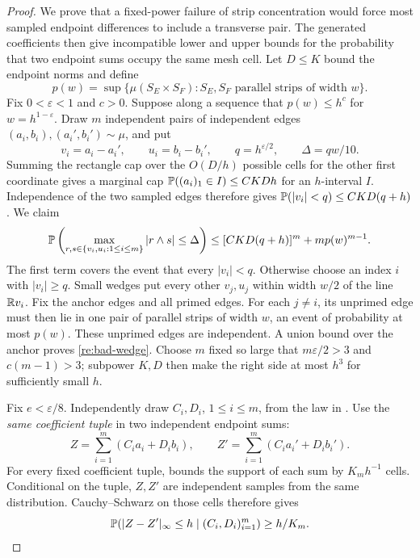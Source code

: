 \begin{proof}
We prove that a fixed-power failure of strip concentration would
force most sampled endpoint differences to include a transverse
pair.  The generated coefficients then give incompatible lower
and upper bounds for the probability that two endpoint sums
occupy the same mesh cell.
Let \(D\le K\) bound the endpoint norms and define
\[
 p(w)=\sup\{\mu(S_E\times S_F):
       S_E,S_F\text{ parallel strips of width }w\}.
\]
Fix \(0<\varepsilon<1\) and \(c>0\).  Suppose along a sequence
that \(p(w)\le h^c\) for \(w=h^{1-\varepsilon}\).
Draw \(m\) independent pairs of independent edges
\((a_i,b_i),(a_i',b_i')\sim\mu\), and put
\[
 v_i=a_i-a_i',\qquad u_i=b_i-b_i',\qquad
 q=h^{\varepsilon/2},\qquad \Delta=qw/10.
\]
Summing the rectangle cap over the \(O(D/h)\) possible cells for
the other first coordinate gives a marginal cap
\(\mathbb P((a_i)_1\in I)\le CKD h\) for an \(h\)-interval \(I\).
Independence of the two sampled edges therefore gives
\(\mathbb P(|v_i|<q)\le CKD(q+h)\).
We claim
\begin{equation}\label{re:bad-wedge}
 \mathbb P\left(\max_{r,s\in\{v_i,u_i:1\le i\le m\}}
                   |r\wedge s|\le\Delta\right)
 \le[CKD(q+h)]^m+m p(w)^{m-1}.
\end{equation}
The first term covers the event that every \(|v_i|<q\).
Otherwise choose an index \(i\) with \(|v_i|\ge q\).  Small wedges
put every other \(v_j,u_j\) within width \(w/2\) of the line
\(\mathbb R v_i\).  Fix the anchor edges and all primed edges.
For each \(j\ne i\), its unprimed edge must then lie in one pair
of parallel strips of width \(w\), an event of probability at most
\(p(w)\).  These unprimed edges are independent.  A union bound over
the anchor proves \eqref{re:bad-wedge}.  Choose \(m\) fixed so large
that \(m\varepsilon/2>3\) and \(c(m-1)>3\); subpower \(K,D\) then make
the right side at most \(h^3\) for sufficiently small \(h\).

Fix \(e<\varepsilon/8\).  Independently draw \(C_i,D_i\), \(1\le i\le m\),
from the law in .
Use the \emph{same coefficient tuple} in two independent endpoint sums:
\[
 Z=\sum_{i=1}^m(C_i a_i+D_i b_i),\qquad
 Z'=\sum_{i=1}^m(C_i a_i'+D_i b_i').
\]
For every fixed coefficient tuple,  bounds
the support of each sum by \(K_mh^{-1}\) cells.  Conditional on the
tuple, \(Z,Z'\) are independent samples from the same distribution.
Cauchy--Schwarz on those cells therefore gives
\begin{equation}\label{re:collision-lower}
 \mathbb P(|Z-Z'|_\infty\le h\mid(C_i,D_i)_{i=1}^m)
 \ge h/K_m.
\end{equation}


\end{proof}
